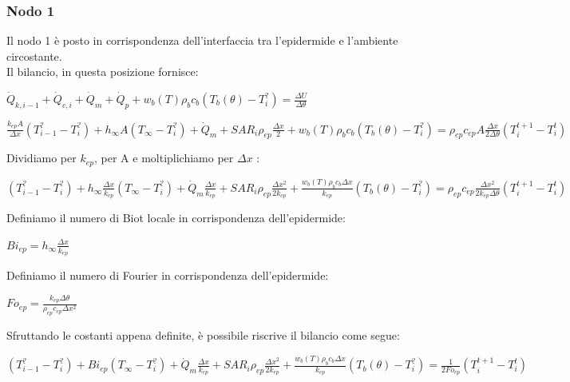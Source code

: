 
\subsubsection*{Nodo 1}
Il nodo 1 è posto in corrispondenza dell'interfaccia tra l'epidermide e l'ambiente circostante.\\Il bilancio, in questa posizione fornisce:
\begin{center}
	$ \Dot{Q} _{k, i-1} +\Dot{Q} _{c, i}+ \Dot{Q} _{m} +\Dot{Q} _{p}+ w_b (T) \rho _b c_b (T_b(\theta)-T_i ^?)= \frac{\Delta U}{\Delta \theta} $
\end{center}

\vspace{0.1cm}
\begin{center}
	$ \frac{k_{ep} A }{\Delta x}(T_{i-1} ^? - T_i ^? ) + h_\infty A (T_{\infty}  - T_i ^? )+ \Dot{Q} _{m} + SAR_i \rho _{ep} \frac{\Delta x}{2}  + w_b (T) \rho _b c_b (T_b(\theta)-T_i ^?) = \rho _{ep} c_{ep} A \frac{\Delta x}{2 \Delta \theta}(T_i ^{t+1} - T_i ^t )$
\end{center}
Dividiamo per $k_{ep}$, per A e moltiplichiamo per $\Delta x$ :
\begin{center}
	$(T_{i-1} ^? - T_i ^? ) + h_\infty \frac{\Delta x }{k_{ep}} (T_{\infty} - T_i ^? )+ \Dot{Q} _{m} \frac{\Delta x }{k_{ep}}+ SAR_i \rho _{ep} \frac{\Delta x^2}{2k_{ep}}  + \frac{ w_b (T) \rho _b c_b \Delta x }{k_{ep}}(T_b(\theta)-T_i ^?) = \rho _{ep} c_{ep}\frac{\Delta x^2}{2 k_{ep} \Delta \theta}(T_i ^{t+1} - T_i ^t )$
\end{center}
\vspace{0.1cm}
\noindent
Definiamo il numero di Biot locale in corrispondenza dell'epidermide:\\
\begin{center}
	$Bi_{ep}= h_\infty \frac{\Delta x }{k_{ep}}$
\end{center}
Definiamo il numero di Fourier in corrispondenza dell'epidermide:
\begin{center}
	$Fo_{ep}= \frac{k_{ep} \Delta \theta}{\rho _{ep} c_{ep} \Delta x^2}$
\end{center}
Sfruttando le costanti appena definite, è possibile riscrive il bilancio come segue:
\begin{center}
	$(T_{i-1} ^? - T_i ^? ) + Bi_{ep} (T_{\infty} - T_i ^? )+ \Dot{Q} _{m} \frac{\Delta x }{k_{ep}}+ SAR_i \rho _{ep} \frac{\Delta x^2}{2k_{ep}}  + \frac{ w_b (T) \rho _b c_b \Delta x }{k_{ep}}(T_b(\theta)-T_i ^?) = \frac{1}{2 Fo_{ep}}(T_i ^{t+1} - T_i ^t )$
\end{center}

